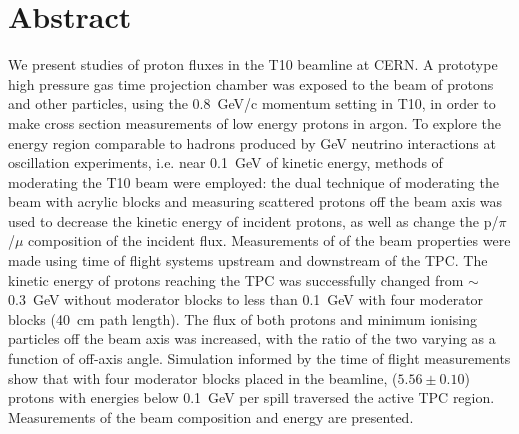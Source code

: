 \section*{Abstract}
We present studies of proton fluxes in the T10 beamline at CERN.
A prototype high pressure gas time projection chamber was exposed to the beam of protons and other particles, using the 0.8~GeV/c momentum setting in T10, in order to make cross section measurements of low energy protons in argon.
To explore the energy region comparable to hadrons produced by GeV neutrino interactions at oscillation experiments, i.e. near 0.1~GeV of kinetic energy, methods of moderating the T10 beam were employed:
the dual technique of moderating the beam with acrylic blocks and measuring scattered protons off the beam axis was used to decrease the kinetic energy of incident protons, as well as change the p/$\pi$/$\mu$ composition of the incident flux.
Measurements of of the beam properties were made using time of flight systems upstream and downstream of the TPC. 
The kinetic energy of protons reaching the TPC was successfully changed from $\sim$0.3~GeV without moderator blocks to less than 0.1~GeV with four moderator blocks (40~cm path length).
The flux of both protons and minimum ionising particles off the beam axis was increased, with the ratio of the two varying as a function of off-axis angle. 
Simulation informed by the time of flight measurements show that with four moderator blocks placed in the beamline,  ($5.56 \pm 0.10$) protons with energies below 0.1~GeV per spill traversed the active TPC region.
Measurements of the beam composition and energy are presented.